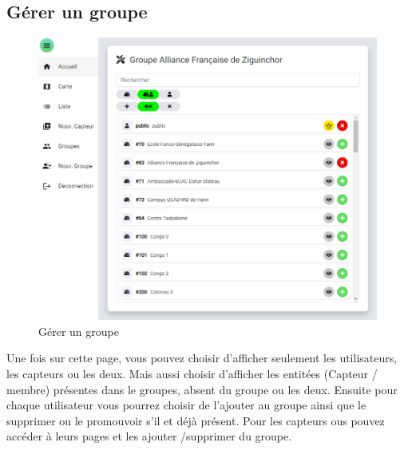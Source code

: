     \subsection{Gérer un groupe}\label{subsec:gerer-un-groupe}

        \begin{figure}[H]
            \begin{center}
                \includegraphics[width=12cm]{resources/group_manage}
            \end{center}
            \caption{Gérer un groupe}\label{fig:group-manage}
        \end{figure}

        Une fois sur cette page, vous pouvez choisir d'afficher seulement les utilisateurs, les capteurs ou les deux.
        Mais aussi choisir d'afficher les entitées (Capteur / membre) présentes dans le groupes, absent du groupe ou les deux.
        Ensuite pour chaque utilisateur vous pourrez choisir de l'ajouter au groupe ainsi que le supprimer ou le promouvoir s'il et déjà présent.
        Pour les capteurs ous pouvez accéder à leurs pages et les ajouter /supprimer du groupe.

